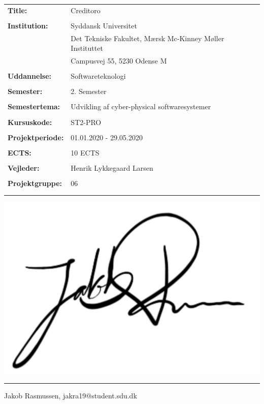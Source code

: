 \noindent
\begin{tabular}{@{}l l} 
\textbf{Title:} & Creditoro \\
& \\
\textbf{Institution:} & Syddansk Universitet \\
& Det Tekniske Fakultet, Mærsk Mc-Kinney Møller Instituttet \\
& Campusvej 55, 5230 Odense M \\
& \\
\textbf{Uddannelse:} & Softwareteknologi \\
& \\
\textbf{Semester:} & 2. Semester \\
& \\
\textbf{Semestertema:} & Udvikling af cyber-physical softwaresystemer \\
& \\
\textbf{Kursuskode:} & ST2-PRO \\
& \\
\textbf{Projektperiode:} &  01.01.2020 - 29.05.2020\\
& \\
\textbf{ECTS:} & 10 ECTS\\
& \\
\textbf{Vejleder:} & Henrik Lykkegaard Larsen\\
& \\
\textbf{Projektgruppe:} & 06\\
& \\

\\
\end{tabular}

\vspace{-9.5mm}
\includegraphics[scale=0.07]{figures/signatures/signatureJR.jpg}
\vspace{-9.5mm}
\par\noindent\rule{\textwidth}{0.4pt}
\noindent
Jakob Rasmussen, jakra19@student.sdu.dk\\

